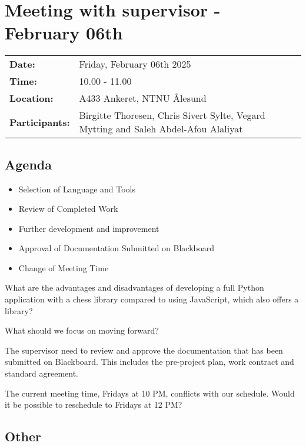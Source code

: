 \section{Meeting with supervisor - February 06th}
\begin{tabular}{ll}
    \textbf{Date:} & Friday, February 06th 2025 \\
    \textbf{Time:} & 10.00 - 11.00\\
    \textbf{Location:} & A433 Ankeret, NTNU Ålesund \\
    \textbf{Participants:} & Birgitte Thoresen, Chris Sivert Sylte, Vegard Mytting and Saleh Abdel-Afou Alaliyat\\
\end{tabular}

\vspace{0.5cm}

\subsection{Agenda}

\begin{itemize}
    \item Selection of Language and Tools
    \item Review of Completed Work
    \item Further development and improvement
    \item Approval of Documentation Submitted on Blackboard
    \item Change of Meeting Time
\end{itemize}

What are the advantages and disadvantages of developing a full Python application with a chess library compared to using JavaScript, which also offers a library?

What should we focus on moving forward?

The supervisor need to review and approve the documentation that has been submitted on Blackboard. This includes the pre-project plan, work contract and standard agreement.  

The current meeting time, Fridays at 10 PM, conflicts with our schedule. Would it be possible to reschedule to Fridays at 12 PM?
\subsection{Other}